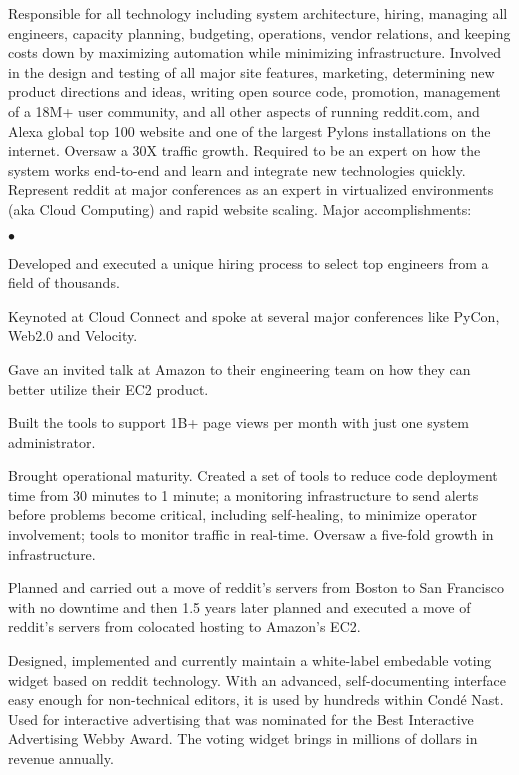 \documentclass[11pt]{article}
\begin{document}
{\small

\noindent
Responsible for all technology including system architecture, hiring, managing all engineers, capacity planning, budgeting, operations, vendor relations, and keeping costs down by maximizing automation while minimizing infrastructure.  Involved in the design and testing of all major site features, marketing, determining new product directions and ideas,  writing open source code, promotion, management of a 18M+ user community, and all other aspects of running reddit.com, and Alexa global top 100 website and one of  the largest Pylons installations on the internet.  Oversaw a 30X traffic growth.  Required to be an expert on how the system works end-to-end and learn and integrate new technologies quickly.  Represent reddit at major conferences as an expert in virtualized environments (aka Cloud Computing) and rapid website scaling.  Major accomplishments:

\begin{list}{$\bullet$}{
}
\item Developed and executed a unique hiring process to select top engineers from a field of thousands.
\item Keynoted at Cloud Connect and spoke at several major conferences like PyCon, Web2.0 and Velocity.
\item Gave an invited talk at Amazon to their engineering team on how they can better utilize their EC2 product.
\item Built the tools to support 1B+ page views per month with just one system administrator.
\item Brought operational maturity.  Created a set of tools to reduce code deployment time from 30 minutes to 1 minute; a monitoring infrastructure to send alerts before problems become critical, including self-healing, to minimize operator involvement; tools to monitor traffic in real-time.  Oversaw a five-fold growth in infrastructure.
\item Planned and carried out a move of reddit's servers from Boston to San Francisco with no downtime and then 1.5 years later planned and executed a move of reddit's servers from colocated hosting to Amazon's EC2.
\item Designed, implemented and currently maintain a white-label embedable voting widget based on reddit technology.  With an advanced, self-documenting interface easy enough for non-technical editors, it is used by hundreds within Cond\'e Nast.  Used for interactive advertising that was nominated for the Best Interactive Advertising Webby Award.  The voting widget brings in millions of dollars in revenue annually.

\end{list}
}
\end{document}
